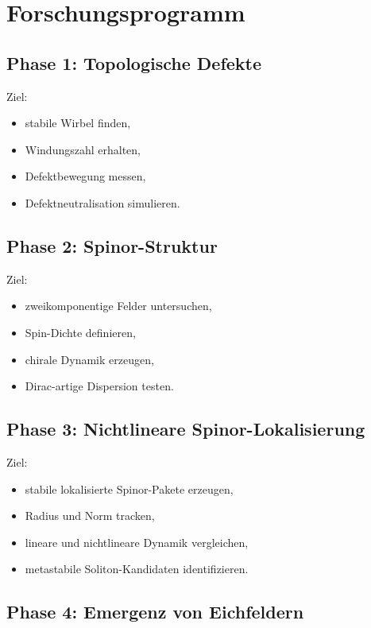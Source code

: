 \documentclass[11pt,a4paper]{article}
\begin{document}
\section{Forschungsprogramm}

\subsection{Phase 1: Topologische Defekte}

Ziel:
\begin{itemize}
  \item stabile Wirbel finden,
  \item Windungszahl erhalten,
  \item Defektbewegung messen,
  \item Defektneutralisation simulieren.
\end{itemize}

\subsection{Phase 2: Spinor-Struktur}

Ziel:
\begin{itemize}
  \item zweikomponentige Felder untersuchen,
  \item Spin-Dichte definieren,
  \item chirale Dynamik erzeugen,
  \item Dirac-artige Dispersion testen.
\end{itemize}

\subsection{Phase 3: Nichtlineare Spinor-Lokalisierung}

Ziel:
\begin{itemize}
  \item stabile lokalisierte Spinor-Pakete erzeugen,
  \item Radius und Norm tracken,
  \item lineare und nichtlineare Dynamik vergleichen,
  \item metastabile Soliton-Kandidaten identifizieren.
\end{itemize}

\subsection{Phase 4: Emergenz von Eichfeldern}
\end{document}
